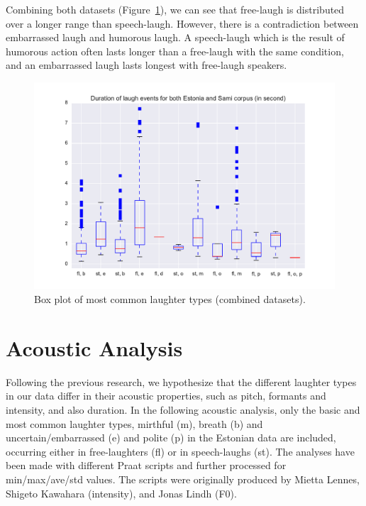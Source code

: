 \documentclass[10pt,journal,compsoc]{IEEEtran}
\begin{document}
Combining both datasets (Figure~\ref{fig:all-duration-boxplot-types}), we can see that free-laugh is distributed over a longer range than speech-laugh. However, there is a contradiction between embarrassed laugh and humorous laugh. A speech-laugh which is the result of humorous action often lasts longer than a free-laugh with the same condition, and an embarrassed laugh lasts longest with free-laugh speakers.

\begin{figure}[!t]
\centering
\includegraphics[width=1\linewidth]{figures/all/duration_boxplot_all.pdf}
\caption{Box plot of most common laughter types (combined datasets).}
\label{fig:all-duration-boxplot-types}
\end{figure}


\section{Acoustic Analysis}
\label{sec:acoustic-analysis}

Following the previous research, we hypothesize that the different laughter types in our data differ in their acoustic properties, such as pitch, formants and intensity, and also duration. In the following acoustic analysis, only the basic and most common laughter types, mirthful (m), breath (b) and uncertain/embarrassed (e) and polite (p) in the Estonian data are included, occurring either in free-laughters (fl) or in speech-laughs (st). The analyses have been made with different Praat scripts and further processed for min/max/ave/std values. The scripts were originally produced by Mietta Lennes, Shigeto Kawahara (intensity), and Jonas Lindh (F0).
\end{document}
